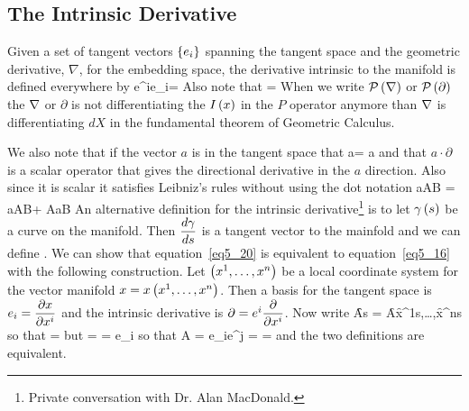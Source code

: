 \subsection{The Intrinsic Derivative}
Given a set of tangent vectors $\left \{ {e_{i}} \right \}$ spanning the tangent space and the geometric derivative, $\nabla$, for the embedding space,
the derivative intrinsic to the manifold is defined everywhere by
\be\label{eq5_16}
	\partial \equiv e^{i}e_{i}\cdot\grad = \Prj{\grad}
\ee
Also note that
\be
\Prj{\partial} = \partial
\ee
When we write ${\mathcal{P}}\left ( {{\mathbf \nabla}} \right )$ or ${\mathcal{P}}\left ( {\partial} \right )$ the ${\mathbf \nabla}$ or $\partial$ is not differentiating the ${I}\left ( {x} \right )$ in the $P$ operator anymore than
${\mathbf \nabla}$ is differentiating $dX$ in the fundamental theorem of Geometric Calculus.

We also note that if the vector $a$ is in the tangent space that
\be
	a\cdot\partial = a\cdot\nabla
\ee
and that $a\cdot\partial$ is a scalar operator that gives the directional derivative in the $a$ direction.  Also since it is scalar
it satisfies Leibniz's rules without using the dot notation \color{red}{\bf (remember the convention that if parenthesis are not
present the operator precedence is dot product then wedge product
then geometric product).}\normalcolor
\be
 a\cdot\partial\lp AB \rp = \lp a\cdot\partial A\rp B+ A\lp a\cdot\partial B\rp
\ee
An alternative definition for the intrinsic derivative\footnote{Private conversation with Dr. Alan MacDonald.} is to let ${\gamma}\left ( {s} \right )$ be a curve
on the manifold.  Then $\displaystyle\frac{d{\gamma}}{d{s}}$ is a tangent vector to the mainfold and we can define
\be\label{eq5_20}
	\hspace{-12pt}\cdot\partial {} \equiv {}.
\ee
We can show that equation~\ref{eq5_20} is equivalent to equation~\ref{eq5_16} with the following construction.  Let $\left ( {x^{1},\dots,x^{n}} \right )$ be
a local coordinate system for the vector manifold $x={x}\left ( {x^{1},\dots,x^{n}} \right )$.  Then a basis for the tangent space is $e_{i}=\displaystyle\frac{\partial{x}}{\partial{x^{i}}}$ and
the intrinsic derivative is $\partial = e^{i}\displaystyle\frac{\partial{}}{\partial{x^{i}}}$.  Now write 
\be
	\f{A}{\f{\gamma}{s}} = \f{A}{\f{x^{1}}{s},\dots,\f{x^{n}}{s}}
\ee
so that
\be
	 = 
\ee
but
\be
	 =  = e_{i}
\ee
so that
\be
	\cdot\partial A = e_{i}\cdot e^{j} =  = 
\ee
and the two definitions are equivalent.

